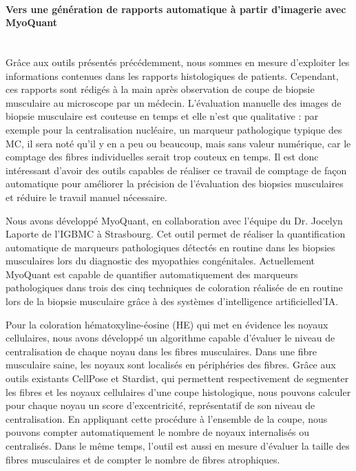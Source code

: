 \paragraph{\textbf{Vers une génération de rapports automatique à partir d’imagerie avec MyoQuant}}\mbox{}\\

Grâce aux outils présentés précédemment, nous sommes en mesure d’exploiter les informations contenues dans les rapports histologiques de patients. Cependant, ces rapports sont rédigés à la main après observation de coupe de biopsie musculaire au microscope par un médecin. L’évaluation manuelle des images de biopsie musculaire est couteuse en temps et elle n’est que qualitative : par exemple pour la centralisation nucléaire, un marqueur pathologique typique des MC, il sera noté qu’il y en a peu ou beaucoup, mais sans valeur numérique, car le comptage des fibres individuelles serait trop couteux en temps. Il est donc intéressant d’avoir des outils capables de réaliser ce travail de comptage de façon automatique pour améliorer la précision de l’évaluation des biopsies musculaires et réduire le travail manuel nécessaire.

Nous avons développé MyoQuant, en collaboration avec l’équipe du Dr. Jocelyn Laporte de l’IGBMC à Strasbourg. Cet outil permet de réaliser la quantification automatique de marqueurs pathologiques détectés en routine dans les biopsies musculaires lors du diagnostic des myopathies congénitales. Actuellement MyoQuant est capable de quantifier automatiquement des marqueurs pathologiques dans trois des cinq techniques de coloration réalisée de en routine lors de la biopsie musculaire grâce à des systèmes d’intelligence artificielled’IA.

Pour la coloration hématoxyline-éosine (HE) qui met en évidence les noyaux cellulaires, nous avons développé un algorithme capable d’évaluer le niveau de centralisation de chaque noyau dans les fibres musculaires. Dans une fibre musculaire saine, les noyaux sont localisés en périphéries des fibres. Grâce aux outils existants CellPose et Stardist, qui permettent respectivement de segmenter les fibres et les noyaux cellulaires d’une coupe histologique, nous pouvons calculer pour chaque noyau un score d’excentricité, représentatif de son niveau de centralisation. En appliquant cette procédure à l’ensemble de la coupe, nous pouvons compter automatiquement le nombre de noyaux internalisés ou centralisés. Dans le même temps, l’outil est aussi en mesure d’évaluer la taille des fibres musculaires et de compter le nombre de fibres atrophiques.

